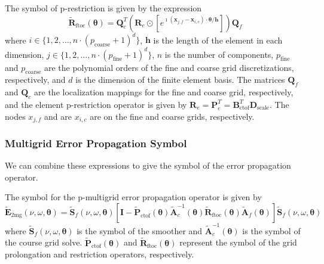 \documentclass[review]{siamart190516}
\begin{document}
\begin{definition}
The symbol of p-restriction is given by the expression
\begin{equation}
\tilde{\mathbf{R}}_{\text{ftoc}} \left( \boldsymbol{\theta} \right) = \mathbf{Q}_c^T \left( \mathbf{R}_e \odot \left[ e^{\imath \left( \mathbf{x}_{j, f} - \mathbf{x}_{i, c} \right) \cdot \boldsymbol{\theta} / \mathbf{h}} \right] \right) \mathbf{Q}_f
\end{equation}
where $i \in \lbrace 1, 2, \dots, n \cdot \left( p_{\text{coarse}} + 1 \right)^d \rbrace$, $\mathbf{h}$ is the length of the element in each dimension, $j \in \lbrace 1, 2, \dots, n \cdot \left( p_{\text{fine}} + 1 \right)^d \rbrace$, $n$ is the number of components, $p_{\text{fine}}$ and $p_{\text{coarse}}$ are the polynomial orders of the fine and coarse grid discretizations, respectively, and $d$ is the dimension of the finite element basis.
The matrices $\mathbf{Q}_f$ and $\mathbf{Q}_c$ are the localization mappings for the fine and coarse grid, respectively, and the element p-restriction operator is given by $\mathbf{R}_e = \mathbf{P}_e^T = \mathbf{B}_{\text{ctof}}^T \mathbf{D}_{\text{scale}}$.
The nodes $x_{j, f}$ and are $x_{i, c}$ are on the fine and coarse grids, respectively.
\end{definition}\label{def:restriction_symbol}

\subsubsection{Multigrid Error Propagation Symbol}\label{sec:multigridsymbol}

We can combine these expressions to give the symbol of the error propagation operator.

\begin{definition}
The symbol for the p-multigrid error propagation operator is given by
\begin{equation}
\tilde{\mathbf{E}}_{\text{2mg}} \left( \nu, \omega, \boldsymbol{\theta} \right) = \tilde{\mathbf{S}}_f \left( \nu, \omega, \boldsymbol{\theta} \right) \left[ \mathbf{I} - \tilde{\mathbf{P}}_{\text{ctof}} \left( \boldsymbol{\theta} \right) \tilde{\mathbf{A}}_c^{-1} \left( \boldsymbol{\theta} \right) \tilde{\mathbf{R}}_{\text{ftoc}} \left( \boldsymbol{\theta} \right) \tilde{\mathbf{A}}_f \left( \boldsymbol{\theta} \right) \right] \tilde{\mathbf{S}}_f \left( \nu, \omega, \boldsymbol{\theta} \right)
\end{equation}
where $\tilde{\mathbf{S}}_f \left( \nu, \omega, \boldsymbol{\theta} \right)$ is the symbol of the smoother and $\tilde{\mathbf{A}}_c^{-1} \left( \boldsymbol{\theta} \right)$ is the symbol of the course grid solve.
$\tilde{\mathbf{P}}_{\text{ctof}} \left( \boldsymbol{\theta} \right)$ and $\tilde{\mathbf{R}}_{\text{ftoc}} \left( \boldsymbol{\theta} \right)$ represent the symbol of the grid prolongation and restriction operators, respectively. 
\end{definition}\label{def:pmultigrid_symbol}
\end{document}
